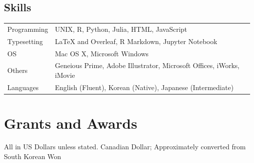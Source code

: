 \documentclass[11pt]{article}
\begin{document}
\subsection*{Skills}
\begin{longtable}{p{}  p{}}
Programming & UNIX, R, Python, Julia, HTML, JavaScript\\
Typesetting &  {\LaTeX} and Overleaf, R Markdown, Jupyter Notebook\\
OS & Mac OS X, Microsoft Windows\\
Others & Geneious Prime, Adobe Illustrator, Microsoft Offices, iWorks, iMovie\\
Languages &  English (Fluent), Korean (Native), Japanese (Intermediate)\vspace{5pt}\\
\end{longtable}



\hspace{0pt}


\section*{Grants and Awards}
All in US Dollars unless stated. \dag Canadian Dollar; \ddag Approximately converted from South Korean Won 
\end{document}
